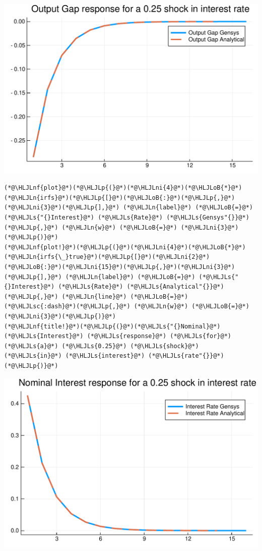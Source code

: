 \documentclass[12pt,a4paper]{article}
\newcommand{\HLJLn}[1]{#1}
\newcommand{\HLJLnf}[1]{\textcolor[RGB]{66,102,213}{#1}}
\newcommand{\HLJLs}[1]{\textcolor[RGB]{201,61,57}{#1}}
\newcommand{\HLJLsc}[1]{\textcolor[RGB]{201,61,57}{#1}}
\newcommand{\HLJLni}[1]{\textcolor[RGB]{59,151,46}{#1}}
\newcommand{\HLJLoB}[1]{\textcolor[RGB]{102,102,102}{\textbf{#1}}}
\newcommand{\HLJLp}[1]{#1}
\begin{document}
\includegraphics[width=\linewidth]{figures/gensys_12_1.pdf}

\begin{lstlisting}
(*@\HLJLnf{plot}@*)(*@\HLJLp{(}@*)(*@\HLJLni{4}@*)(*@\HLJLoB{*}@*)(*@\HLJLn{irfs}@*)(*@\HLJLp{[}@*)(*@\HLJLoB{:}@*)(*@\HLJLp{,}@*)(*@\HLJLni{3}@*)(*@\HLJLp{],}@*) (*@\HLJLn{label}@*) (*@\HLJLoB{=}@*) (*@\HLJLs{"{}Interest}@*) (*@\HLJLs{Rate}@*) (*@\HLJLs{Gensys"{}}@*)(*@\HLJLp{,}@*) (*@\HLJLn{w}@*) (*@\HLJLoB{=}@*) (*@\HLJLni{3}@*)(*@\HLJLp{)}@*)
(*@\HLJLnf{plot!}@*)(*@\HLJLp{(}@*)(*@\HLJLni{4}@*)(*@\HLJLoB{*}@*)(*@\HLJLn{irfs{\_}true}@*)(*@\HLJLp{[}@*)(*@\HLJLni{2}@*)(*@\HLJLoB{:}@*)(*@\HLJLni{15}@*)(*@\HLJLp{,}@*)(*@\HLJLni{3}@*)(*@\HLJLp{],}@*) (*@\HLJLn{label}@*) (*@\HLJLoB{=}@*) (*@\HLJLs{"{}Interest}@*) (*@\HLJLs{Rate}@*) (*@\HLJLs{Analytical"{}}@*)(*@\HLJLp{,}@*) (*@\HLJLn{line}@*) (*@\HLJLoB{=}@*) (*@\HLJLsc{:dash}@*)(*@\HLJLp{,}@*) (*@\HLJLn{w}@*) (*@\HLJLoB{=}@*) (*@\HLJLni{3}@*)(*@\HLJLp{)}@*)
(*@\HLJLnf{title!}@*)(*@\HLJLp{(}@*)(*@\HLJLs{"{}Nominal}@*) (*@\HLJLs{Interest}@*) (*@\HLJLs{response}@*) (*@\HLJLs{for}@*) (*@\HLJLs{a}@*) (*@\HLJLs{0.25}@*) (*@\HLJLs{shock}@*) (*@\HLJLs{in}@*) (*@\HLJLs{interest}@*) (*@\HLJLs{rate"{}}@*)(*@\HLJLp{)}@*)
\end{lstlisting}

\includegraphics[width=\linewidth]{figures/gensys_13_1.pdf}
\end{document}
